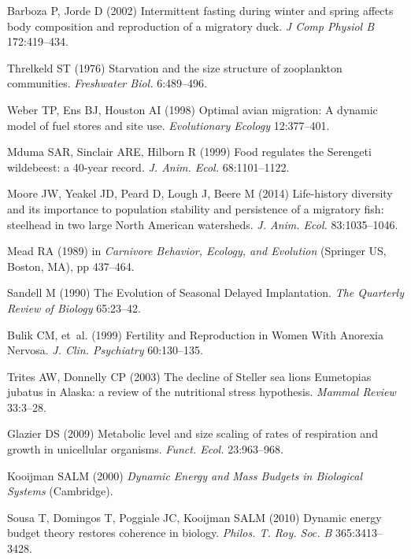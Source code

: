 \documentclass{pnastwo}
\begin{document}
\begin{article}
\begin{thebibliography}{10}
Barboza P, Jorde D
\newblock (2002) {Intermittent fasting during winter and spring affects body
  composition and reproduction of a migratory duck}.
\newblock \emph{J Comp Physiol B} 172:419--434.

Threlkeld ST
\newblock (1976) {Starvation and the size structure of zooplankton
  communities}.
\newblock \emph{Freshwater Biol.} 6:489--496.

Weber TP, Ens BJ, Houston AI
\newblock (1998) {Optimal avian migration: A dynamic model of fuel stores and
  site use}.
\newblock \emph{Evolutionary Ecology} 12:377--401.

Mduma SAR, Sinclair ARE, Hilborn R
\newblock (1999) {Food regulates the Serengeti wildebeest: a 40-year record}.
\newblock \emph{J. Anim. Ecol.} 68:1101--1122.

Moore JW, Yeakel JD, Peard D, Lough J, Beere M
\newblock (2014) {Life-history diversity and its importance to population
  stability and persistence of a migratory fish: steelhead in two large North
  American watersheds}.
\newblock \emph{J. Anim. Ecol.} 83:1035--1046.

Mead RA
\newblock (1989) in \emph{Carnivore Behavior, Ecology, and Evolution}
\newblock (Springer US, Boston, MA), pp 437--464.

Sandell M
\newblock (1990) {The Evolution of Seasonal Delayed Implantation}.
\newblock \emph{The Quarterly Review of Biology} 65:23--42.

Bulik CM, {et~al.}
\newblock (1999) {Fertility and Reproduction in Women With Anorexia Nervosa}.
\newblock \emph{J. Clin. Psychiatry} 60:130--135.

Trites AW, Donnelly CP
\newblock (2003) {The decline of Steller sea lions Eumetopias jubatus in
  Alaska: a review of the nutritional stress hypothesis}.
\newblock \emph{Mammal Review} 33:3--28.

Glazier DS
\newblock (2009) {Metabolic level and size scaling of rates of respiration and
  growth in unicellular organisms}.
\newblock \emph{Funct. Ecol.} 23:963--968.

Kooijman SALM
\newblock (2000) \emph{{Dynamic Energy and Mass Budgets in Biological Systems}}
\newblock (Cambridge).

Sousa T, Domingos T, Poggiale JC, Kooijman SALM
\newblock (2010) {Dynamic energy budget theory restores coherence in biology}.
\newblock \emph{Philos. T. Roy. Soc. B} 365:3413--3428.


\end{thebibliography}
\end{article}
\end{document}
